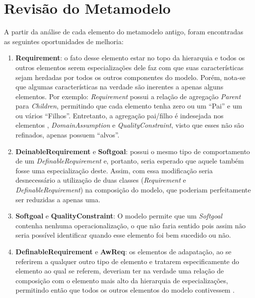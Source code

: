 \section{Revisão do Metamodelo}
\label{sec-zanshin-revisao}
A partir da análise de cada elemento do metamodelo antigo, foram encontradas as seguintes oportunidades de melhoria:

\begin{enumerate}
	\item \textbf{Requirement}: o fato desse elemento estar no topo da hierarquia e todos os outros elementos serem especializações dele faz com que suas características sejam herdadas por todos os outros componentes do modelo. Porém, nota-se que algumas características na verdade são inerentes a apenas alguns elementos. Por exemplo: \textit{Requirement} possui a relação de agregação \textit{Parent} para \textit{Children}, permitindo que cada elemento tenha zero ou um ``Pai'' e um ou vários ``Filhos''. Entretanto, a agregação pai/filho é indesejada nos elementos \awreq, \textit{DomainAssumption} e \textit{QualityConstraint}, visto que esses não são refinados, apenas possuem ``alvos''. \label{p1}
	
	\item \textbf{DeinableRequirement} e \textbf{Softgoal}: \sofgoal possui o mesmo tipo de comportamento de um \textit{DefinableRequirement} e, portanto, seria esperado que aquele também fosse uma especialização deste. Assim, com essa modificação seria desnecessário a utilização de duas classes (\textit{Requirement} e \textit{DefinableRequirement}) na composição do modelo, que poderiam perfeitamente ser reduzidas a apenas uma. \label{p2}
	
	\item \textbf{Softgoal} e \textbf{QualityConstraint}: O modelo permite que um \textit{Softgoal} contenha nenhuma operacionalização, o que não faria sentido pois assim não seria possível identificar quando esse elemento foi bem sucedido ou não. \label{p3}
	
	\item \textbf{DefinableRequirement} e \textbf{AwReq}: os elementos de adapatação, ao se referirem a qualquer outro tipo de elemento e tratarem especificamente do elemento ao qual se referem, deveriam ter na verdade uma relação de composição com o elemento mais alto da hierarquia de especializações, permitindo então que todos os outros elementos do modelo contivessem \awreqs. \label{p4}
	

\end{enumerate}

